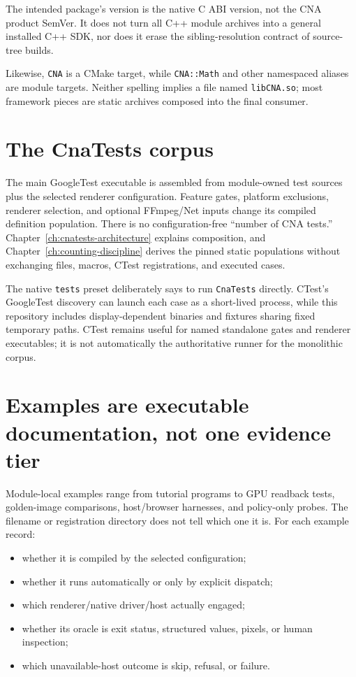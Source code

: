 The intended package's version is the native C ABI version, not the CNA product SemVer. It does not turn
all C++ module archives into a general installed C++ SDK, nor does it erase the sibling-resolution
contract of source-tree builds.

Likewise, \texttt{CNA} is a CMake target, while \texttt{CNA::Math} and other namespaced aliases are
module targets.  Neither spelling implies a file named \texttt{libCNA.so}; most framework pieces are
static archives composed into the final consumer.

\section{The CnaTests corpus}

The main GoogleTest executable is assembled from module-owned test sources plus the selected
renderer configuration.  Feature gates, platform exclusions, renderer selection, and optional
FFmpeg/Net inputs change its compiled definition population.  There is no configuration-free
“number of CNA tests.”  Chapter~\ref{ch:cnatests-architecture} explains composition, and
Chapter~\ref{ch:counting-discipline} derives the pinned static populations without exchanging files,
macros, CTest registrations, and executed cases.

The native \texttt{tests} preset deliberately says to run \texttt{CnaTests} directly.  CTest's
GoogleTest discovery can launch each case as a short-lived process, while this repository includes
display-dependent binaries and fixtures sharing fixed temporary paths.  CTest remains useful for
named standalone gates and renderer executables; it is not automatically the authoritative runner
for the monolithic corpus.

\section{Examples are executable documentation, not one evidence tier}

Module-local examples range from tutorial programs to GPU readback tests, golden-image comparisons,
host/browser harnesses, and policy-only probes.  The filename or registration directory does not
tell which one it is.  For each example record:

\begin{itemize}
  \item whether it is compiled by the selected configuration;
  \item whether it runs automatically or only by explicit dispatch;
  \item which renderer/native driver/host actually engaged;
  \item whether its oracle is exit status, structured values, pixels, or human inspection;
  \item which unavailable-host outcome is skip, refusal, or failure.
\end{itemize}

